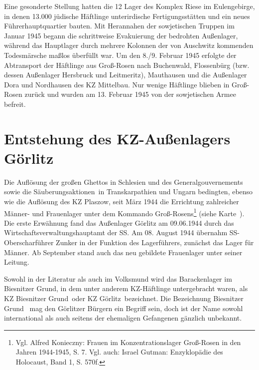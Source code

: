 \begin{fshaded}
Eine gesonderte Stellung hatten die 12 Lager des Komplex Riese im Eulengebirge, in denen 13.000 jüdische Häftlinge unterirdische Fertigungsstätten und ein neues Führerhauptquartier bauten. Mit Herannahen der sowjetischen Truppen im Januar 1945 begann die schrittweise Evakuierung der bedrohten Außenlager, während das Hauptlager durch mehrere Kolonnen der von Auschwitz kommenden Todesmärsche maßlos überfüllt war. Um den 8./9. Februar 1945 erfolgte der Abtransport der Häftlinge aus Groß-Rosen nach Buchenwald, Flossenbürg (bzw. dessen Außenlager Hersbruck und Leitmeritz), Mauthausen und die Außenlager Dora und Nordhausen des KZ Mittelbau. Nur wenige Häftlinge blieben in Groß-Rosen zurück und wurden am 13. Februar 1945 von der sowjetischen Armee befreit.
\end{fshaded}



\section{Entstehung des KZ-Außenlagers Görlitz}
Die Auflösung der großen Ghettos in Schlesien und des Generalgouvernements sowie die \glqq Säuberungsaktionen\grqq~in Transkarpathien und Ungarn bedingten, ebenso wie die Auflösung des KZ Plaszow, seit März 1944 die Errichtung zahlreicher Männer- und Frauenlager unter dem Kommando Groß-Rosens\footnote{Vgl. Alfred Konieczny: Frauen im Konzentrationslager Groß-Rosen in den Jahren 1944-1945, S. 7. Vgl. auch: Israel Gutman: Enzyklopädie des Holocaust, Band 1, S. 570f.} (siehe Karte~). Die erste Erwähnung fand das Außenlager Görlitz am 09.06.1944 durch das Wirtschaftsverwaltungshauptamt der SS. Am 08. August 1944 übernahm SS-Oberscharführer Zunker in der Funktion des Lagerführers, zunächst das Lager für Männer. Ab September stand auch das neu gebildete Frauenlager unter seiner Leitung.\newline

Sowohl in der Literatur als auch im Volksmund wird das Barackenlager im Biesnitzer Grund, in dem unter anderem KZ-Häftlinge untergebracht waren, als \glqq KZ Biesnitzer Grund\grqq~\linebreak oder \glqq KZ Görlitz\grqq~bezeichnet.
Die Bezeichnung \glqq Biesnitzer Grund\grqq~ mag den Görlitzer Bürgern ein Begriff sein, doch ist der Name sowohl international als auch seitens der ehemaligen Gefangenen gänzlich unbekannt.\newline

